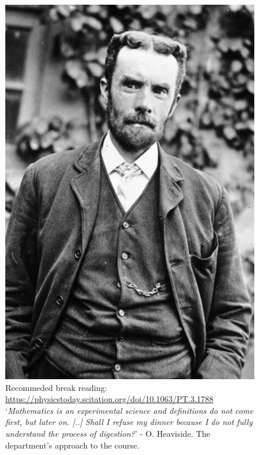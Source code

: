 \begin{figure}
\centering
\includegraphics[scale=0.2]{"Figures/Hside"}
\captionsetup{justification=centering}
\caption{Recommeded break reading: \url{https://physicstoday.scitation.org/doi/10.1063/PT.3.1788} `\textit{Mathematics is an experimental science and definitions do not come first, but later on. [..] Shall I refuse my dinner because I do not fully understand the process of digestion?}' - O. Heaviside. The department's approach to the course. } %
\label{fig:Hside}
\end{figure}
\newpage
